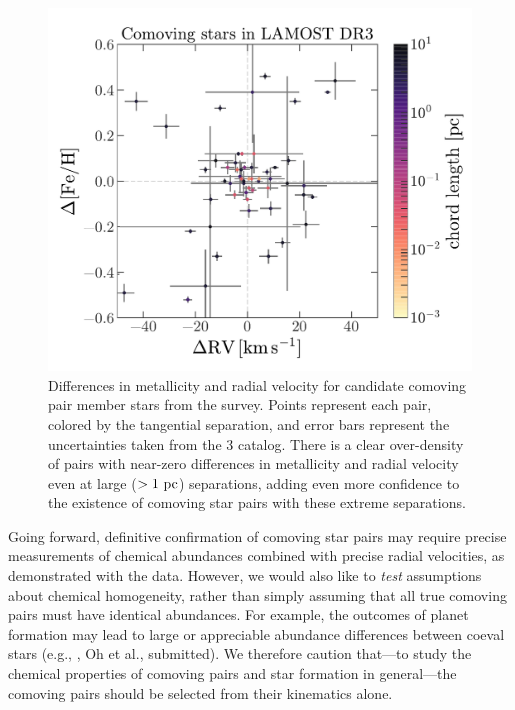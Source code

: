 \documentclass[modern, letterpaper]{aastex61}
\newcommand{\DR}[1]{\acronym{DR}#1}
\begin{document}
\begin{figure}[htbp]
  \begin{center}
    \includegraphics[width=0.9\linewidth]{lamost.pdf}
  \end{center}
  \caption{%
    Differences in metallicity and radial velocity for candidate comoving pair
    member stars from the  survey.
    Points represent each pair, colored by the tangential separation, and
    error bars represent the uncertainties taken from the 
    \DR{3} catalog.
    There is a clear over-density of pairs with near-zero differences in
    metallicity and radial velocity even at large ($>1~\mathrm{pc}$) separations, adding
    even more confidence to the existence of comoving star pairs with these
    extreme separations.
    \label{fig:lamost}}
\end{figure}

Going forward, definitive confirmation of comoving star pairs may require
precise measurements of chemical abundances combined with precise radial
velocities, as demonstrated with the  data.
However, we would also like to \emph{test} assumptions about chemical
homogeneity, rather than simply assuming that all true comoving pairs must have
identical abundances.
For example, the outcomes of planet formation may lead to large or appreciable
abundance differences between coeval stars (e.g., \citealt{Pinsonneault:2001},
Oh et al., submitted).
We therefore caution that---to study the chemical properties of comoving pairs
and star formation in general---the comoving pairs should be selected from their
kinematics alone.
\end{document}
